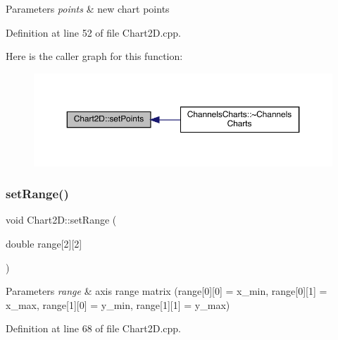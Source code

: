 \begin{DoxyParams}{Parameters}
{\em points} & new chart points \\
\hline
\end{DoxyParams}


Definition at line 52 of file Chart2\+D.\+cpp.

Here is the caller graph for this function\+:
\nopagebreak
\begin{figure}[H]
\begin{center}
\leavevmode
\includegraphics[width=350pt]{class_chart2_d_a90db5078374163beef86536a33bbe8ba_icgraph}
\end{center}
\end{figure}
\mbox{\label{class_chart2_d_acc60a5df11a3bb47c7888e108cd50f05}} 
\subsubsection{\texorpdfstring{set\+Range()}{setRange()}}
{\footnotesize\ttfamily void Chart2\+D\+::set\+Range (\begin{DoxyParamCaption}\item[{double}]{range\mbox{[}2\mbox{]}\mbox{[}2\mbox{]} }\end{DoxyParamCaption})}


\begin{DoxyParams}{Parameters}
{\em range} & axis range matrix (range\mbox{[}0\mbox{]}\mbox{[}0\mbox{]} = x\+\_\+min, range\mbox{[}0\mbox{]}\mbox{[}1\mbox{]} = x\+\_\+max, range\mbox{[}1\mbox{]}\mbox{[}0\mbox{]} = y\+\_\+min, range\mbox{[}1\mbox{]}\mbox{[}1\mbox{]} = y\+\_\+max) \\
\hline
\end{DoxyParams}


Definition at line 68 of file Chart2\+D.\+cpp.

